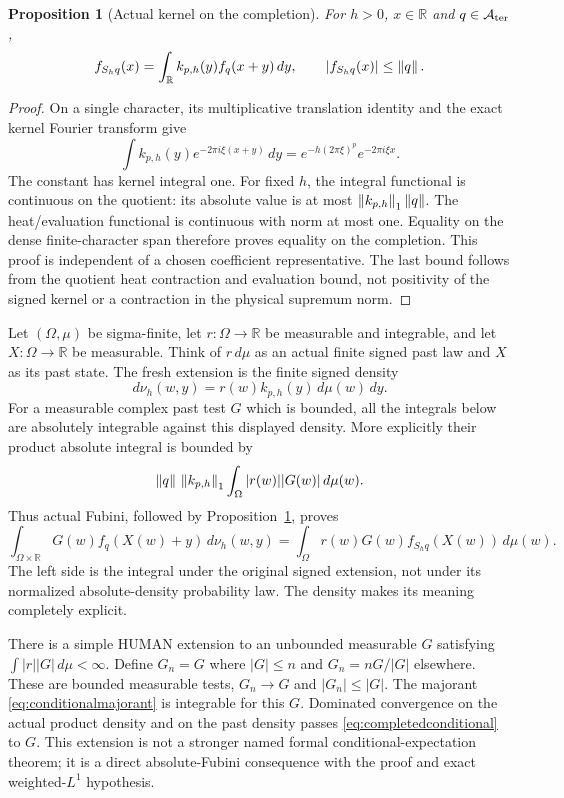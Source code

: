 \documentclass[11pt]{article}
\newtheorem{proposition}[theorem]{Proposition}
\theoremstyle{remark}\newtheorem{remark}[theorem]{Remark}
\newcommand{\R}{\mathbb R}\newcommand{\C}{\mathbb C}
\newcommand{\A}{\mathcal A}\newcommand{\X}{\mathcal X}
\begin{document}
\begin{proposition}[Actual kernel on the completion]\label{prop:terminalkernel}
For $h>0$, $x\in\R$ and $q\in\A_{\rm ter}$,
\begin{equation}\label{eq:terminalkernel}
 f_{S_hq}(x)=\int_\R k_{p,h}(y)f_q(x+y)\,dy,
 \qquad |f_{S_hq}(x)|\leq\norm q.
\end{equation}
\end{proposition}
\begin{proof}
On a single character, its multiplicative translation identity
and the exact kernel Fourier transform give
\[
 \int k_{p,h}(y)e^{-2\pi i\xi(x+y)}\,dy
       =e^{-h(2\pi\xi)^p}e^{-2\pi i\xi x}.
\]
The constant has kernel integral one. For fixed $h$, the integral
functional is continuous on the quotient: its absolute value is
at most $\left\lVert k_{p,h}\right\rVert_1\left\lVert q\right\rVert$. The heat/evaluation
functional is continuous with norm at most one. Equality on
the dense finite-character span therefore proves equality on
the completion. This proof is independent of a chosen
coefficient representative. The last bound follows from the
quotient heat contraction and evaluation bound, not positivity
of the signed kernel or a contraction in the physical supremum norm.
\end{proof}

Let $(\Omega,\mu)$ be sigma-finite, let $r:\Omega\to\R$
be measurable and integrable, and let $X:\Omega\to\R$ be
measurable. Think of $r\,d\mu$ as an actual finite signed past
law and $X$ as its past state. The fresh extension is the
finite signed density
\[
 d\nu_h(w,y)=r(w)k_{p,h}(y)\,d\mu(w)\,dy.
\]
For a measurable complex past test $G$ which is bounded, all
the integrals below are absolutely integrable against this
displayed density. More explicitly their product absolute
integral is bounded by
\begin{equation}\label{eq:conditionalmajorant}
 \left\lVert q\right\rVert\,\left\lVert k_{p,h}\right\rVert_1\int_\Omega|r(w)||G(w)|\,d\mu(w).
\end{equation}
Thus actual Fubini, followed by
Proposition~\ref{prop:terminalkernel}, proves
\begin{equation}\label{eq:completedconditional}
 \int_{\Omega\times\R}G(w)f_q(X(w)+y)\,d\nu_h(w,y)
 =\int_\Omega r(w)G(w)f_{S_hq}(X(w))\,d\mu(w).
\end{equation}
The left side is the integral under the original signed
extension, not under its normalized absolute-density probability
law. The density makes its meaning completely explicit.

There is a simple HUMAN extension to an unbounded measurable
$G$ satisfying $\int|r||G|\,d\mu<\infty$. Define $G_n=G$
where $|G|\leq n$ and $G_n=nG/|G|$ elsewhere. These are bounded
measurable tests, $G_n\to G$ and $|G_n|\leq|G|$.
The majorant \eqref{eq:conditionalmajorant} is integrable for
this $G$. Dominated convergence on the actual product density
and on the past density passes \eqref{eq:completedconditional}
to $G$. This extension is not a stronger named formal
conditional-expectation theorem; it is a direct absolute-Fubini
consequence with the proof and exact weighted-$L^1$ hypothesis.
\end{document}
